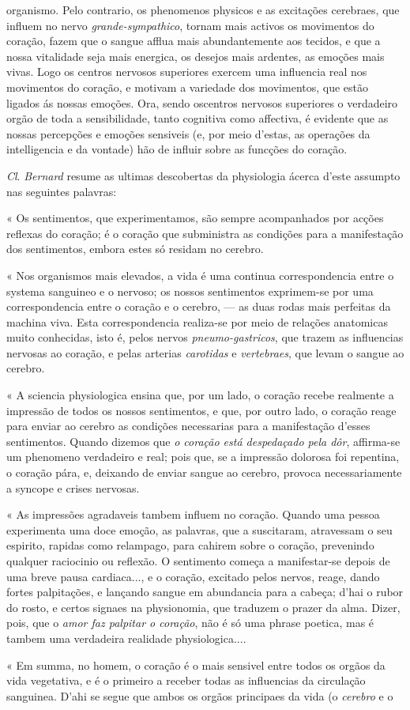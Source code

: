 organismo. Pelo contrario, os phenomenos physicos e as excitações cerebraes, que influem no nervo \emph{grande-sympathico}, tornam mais activos os movimentos do coração, fazem que o sangue afflua mais abundantemente aos tecidos, e que a nossa vitalidade seja mais energica, os desejos mais ardentes, as emoções mais vivas. Logo os centros nervosos superiores exercem uma influencia real nos movimentos do coração, e motivam a variedade dos movimentos, que estão ligados ás nossas emoções. Ora, sendo oscentros nervosos superiores o verdadeiro orgão de toda a sensibilidade, tanto cognitiva como affectiva, é evidente que as nossas percepções e emoções sensiveis (e, por meio d'estas, as operações da intelligencia e da vontade) hão de influir sobre as funcções do coração.\par \emph{Cl}. \emph{Bernard} resume as ultimas descobertas da physiologia ácerca d'este assumpto nas seguintes palavras:\par « Os sentimentos, que experimentamos, são sempre acompanhados por acções reflexas do coração; é o coração que subministra as condições para a manifestação dos sentimentos, embora estes só residam no cerebro.\par « Nos organismos mais elevados, a vida é uma continua correspondencia entre o systema sanguineo e o nervoso; os nossos sentimentos exprimem-se por uma correspondencia entre o coração e o cerebro, --- as duas rodas mais perfeitas da machina viva. Esta correspondencia realiza-se por meio de relações anatomicas muito conhecidas, isto é, pelos nervos \emph{pneumo-gastricos}, que trazem as influencias nervosas ao coração, e pelas arterias \emph{carotidas} e \emph{vertebraes}, que levam o sangue ao cerebro.\par « A sciencia physiologica ensina que, por um lado, o coração recebe realmente a impressão de todos os nossos sentimentos, e que, por outro lado, o coração reage para enviar ao cerebro as condições necessarias para a manifestação d'esses sentimentos. Quando dizemos que \emph{o coração está despedaçado pela dôr}, affirma-se um phenomeno verdadeiro e real; pois que, se a impressão dolorosa foi repentina, o coração pára, e, deixando de enviar sangue ao cerebro, provoca necessariamente a syncope e crises nervosas.\par « As impressões agradaveis tambem influem no coração. Quando uma pessoa experimenta uma doce emoção, as palavras, que a suscitaram, atravessam o seu espirito, rapidas como relampago, para cahirem sobre o coração, prevenindo qualquer raciocinio ou reflexão. O sentimento começa a manifestar-se depois de uma breve pausa cardiaca..., e o coração, excitado pelos nervos, reage, dando fortes palpitações, e lançando sangue em abundancia para a cabeça; d'hai o rubor do rosto, e certos signaes na physionomia, que traduzem o prazer da alma. Dizer, pois, que o \emph{amor faz palpitar o coração}, não é só uma phrase poetica, mas é tambem uma verdadeira realidade physiologica....\par « Em summa, no homem, o coração é o mais sensivel entre todos os orgãos da vida vegetativa, e é o primeiro a receber todas as influencias da circulação sanguinea. D'ahi se segue que ambos os orgãos principaes da vida (o \emph{cerebro} e o 